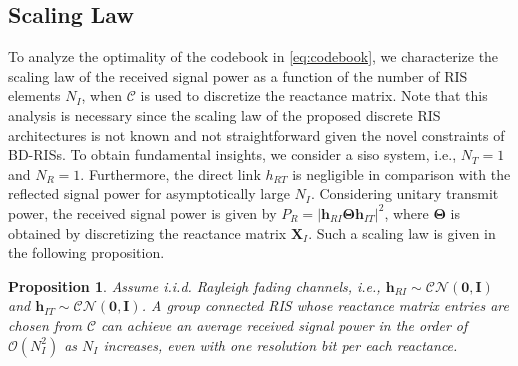 \documentclass[twocolumn,10pt]{IEEEtran}
\newtheorem{proposition}{Proposition}
\begin{document}
\subsection{Scaling Law}

To analyze the optimality of the codebook in \eqref{eq:codebook}, we characterize the scaling law of the received signal power as a function of the number of RIS elements $N_I$, when $\mathcal{C}$ is used to discretize the reactance matrix.
Note that this analysis is necessary since the scaling law of the proposed discrete RIS architectures is not known and not straightforward given the novel constraints of BD-RISs.
To obtain fundamental insights, we consider a \gls{siso} system, i.e., $N_T=1$ and $N_R=1$.
Furthermore, the direct link $h_{RT}$ is negligible in comparison with the reflected signal power for asymptotically large $N_I$.
Considering unitary transmit power, the received signal power is given by $P_R=\left|\mathbf{h}_{RI}\boldsymbol{\Theta}\mathbf{h}_{IT}\right|^2$, where $\boldsymbol{\Theta}$ is obtained by discretizing the reactance matrix $\mathbf{X}_I$.
Such a scaling law is given in the following proposition.
\begin{proposition}
Assume i.i.d. Rayleigh fading channels, i.e., $\mathbf{h}_{RI}\sim\mathcal{CN}\left(\mathbf{0},\mathbf{I}\right)$ and $\mathbf{h}_{IT}\sim\mathcal{CN}\left(\mathbf{0},\mathbf{I}\right)$.
A group connected RIS whose reactance matrix entries are chosen from $\mathcal{C}$ can achieve an average received signal power in the order of $\mathcal{O}\left(N_I^2\right)$ as $N_I$ increases, even with one resolution bit per each reactance.
\label{pro:1}
\end{proposition}
\end{document}
